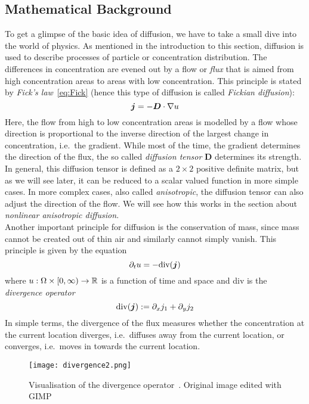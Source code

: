 \subsection{Mathematical Background}
To get a glimpse of the basic idea of diffusion, we have to take a small dive into the world of
physics.
As mentioned in the introduction to this section, diffusion is used to describe processes of
particle or concentration distribution. The differences in concentration are evened out by a flow
or \textit{flux} that is aimed from high concentration areas to areas with low concentration. This
principle is stated by \textit{Fick's law}~\eqref{eq:Fick} (hence this type of diffusion is called \textit{Fickian
diffusion}):
\begin{equation}
    \boldsymbol j = -\boldsymbol D\cdot\mathbf{\nabla} u\label{eq:Fick}
\end{equation}
Here, the flow from high to low concentration areas is modelled by a flow whose direction is
proportional to the inverse direction of the largest change in concentration, i.e.\ the gradient.
While most of the time, the gradient determines the direction of the flux, the so called
\textit{diffusion tensor} $\boldsymbol D$ determines its strength. In general, this diffusion
tensor is defined as a
$2\times2$ positive definite matrix, but as we will see later, it can be reduced to a scalar 
valued function in more simple cases.
In more complex cases, also called \textit{anisotropic}, the diffusion tensor can also adjust the
direction of the flow. We will see how this works in the section about \textit{nonlinear
anisotropic diffusion}.\\
Another important principle for diffusion is the conservation of mass, since mass cannot be created
out of thin air and similarly cannot simply vanish.
This principle is given by the equation
\begin{equation}
    \partial_t u = - \textnormal{div}(\boldsymbol j)\label{eq:Conservation}
\end{equation}
where $u: \Omega \times [0, \infty) \rightarrow \mathbb{R}$ is a function of time and space and div
is the \textit{divergence operator}
\begin{equation}
    \textnormal{div}(\boldsymbol j) := \partial_x j_1 + \partial_y j_2
\end{equation}
In simple terms, the divergence of the flux measures whether the concentration at the current
location diverges, i.e.\ diffuses away from the current location, or converges, i.e.\ moves in
towards the current location.
\begin{figure}[H]
    \centering
    \texttt{[image: divergence2.png]}
    \caption{Visualisation of the divergence operator~\cite{img-divergence}. Original image edited
    with GIMP~\cite{gimp}}\label{fig:Divergence}
\end{figure}
